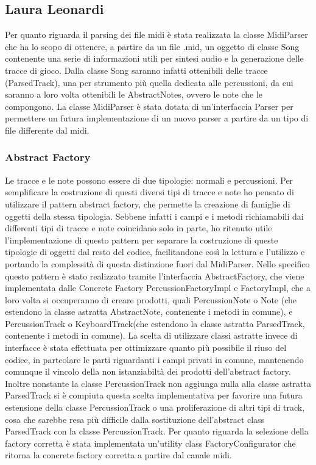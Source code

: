 \documentclass[a4paper,12pt]{report}
\begin{document}
\subsection{Laura Leonardi}
Per quanto riguarda il parsing dei file midi è stata realizzata la classe MidiParser che ha lo scopo di ottenere, a partire da un file .mid, un oggetto di classe Song contenente una serie di informazioni utili per sintesi audio e la generazione delle tracce di gioco. Dalla classe Song saranno infatti ottenibili delle tracce (ParsedTrack), una per strumento più quella dedicata alle percussioni, da cui saranno a loro volta ottenibili le AbstractNotes, ovvero le note che le compongono. La classe MidiParser è stata dotata di un'interfaccia Parser per permettere un futura implementazione di un nuovo parser a partire da un tipo di file differente dal midi.

\subsubsection{Abstract Factory}

\begingroup
\fontsize{10pt}{12pt}\selectfont
Le tracce e le note possono essere di due tipologie: normali e percussioni. Per semplificare la costruzione di questi diversi tipi di tracce e note ho pensato di utilizzare il pattern abstract factory, che permette la creazione di famiglie di oggetti della stessa tipologia. Sebbene infatti i campi e i metodi richiamabili dai differenti tipi di tracce e note coincidano solo in parte, ho ritenuto utile l'implementazione di questo pattern per separare la costruzione di queste tipologie di oggetti dal resto del codice, facilitandone così la lettura e l'utilizzo e portando la complessità di questa distinzione fuori dal MidiParser. Nello specifico questo pattern è stato realizzato tramite l'interfaccia AbstractFactory, che viene implementata dalle Concrete Factory PercussionFactoryImpl e FactoryImpl, che a loro volta si occuperanno di creare prodotti, quali PercussionNote o Note (che estendono la classe astratta AbstractNote, contenente i metodi in comune), e PercussionTrack o KeyboardTrack(che estendono la classe astratta ParsedTrack, contenente i metodi in comune). La scelta di utilizzare classi astratte invece di interfacce è stata effettuata per ottimizzare quanto più possibile il riuso del codice, in partcolare le parti riguardanti i campi privati in comune, mantenendo comunque il vincolo della non istanziabiltà dei prodotti dell'abstract factory. Inoltre nonstante la classe PercussionTrack non aggiunga nulla alla classe astratta ParsedTrack si è compiuta questa scelta implementativa per favorire una futura estensione della classe PercussionTrack o una proliferazione di altri tipi di track, cosa che sarebbe resa più difficile dalla sostituzione dell'abstract class ParsedTrack con la classe PercussionTrack. Per quanto riguarda la selezione della factory corretta è stata implementata un'utility class FactoryConfigurator che ritorna la concrete factory corretta a partire dal canale midi.
\endgroup
\newpage
\end{document}

